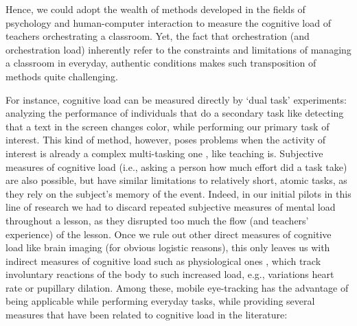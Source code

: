 \documentclass[10pt,journal,compsoc]{IEEEtran}
\begin{document}
Hence, we could adopt the wealth of methods developed in the fields of psychology and human-computer interaction to measure the cognitive load of teachers orchestrating a classroom. Yet, the fact that orchestration (and orchestration load) inherently refer to the constraints and limitations of managing a classroom in everyday, authentic conditions \cite{Roschelle2013} makes such transposition of methods quite challenging. 

For instance, cognitive load can be measured directly by `dual task' experiments: analyzing the performance of individuals that do a secondary task like detecting that a text in the screen changes color, while performing our primary task of interest. This kind of method, however, poses problems when the activity of interest is already a complex multi-tasking one \cite{Paas2003}, like teaching is. Subjective measures of cognitive load (i.e., asking a person how much effort did a task take) are also possible, but have similar limitations to relatively short, atomic tasks, as they rely on the subject's memory of the event. Indeed, in our initial pilots in this line of research we had to discard repeated subjective measures of mental load throughout a lesson, as they disrupted too much the flow (and teachers' experience) of the lesson. Once we rule out other direct measures of cognitive load like brain imaging (for obvious logistic reasons), this only leaves us with indirect measures of cognitive load such as physiological ones \cite{Brunken2003}, which track involuntary reactions of the body to such increased load, e.g., variations heart rate or pupillary dilation. Among these, mobile eye-tracking has the advantage of being applicable while performing everyday tasks, while providing several measures that have been related to cognitive load in the literature:
\end{document}
